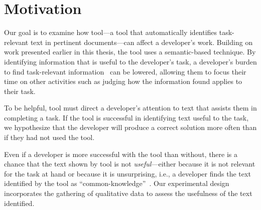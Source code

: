 


\section{Motivation}
\label{cp6:method}



Our goal is to examine how \acs{tool}---a tool that 
automatically identifies
task-relevant text in pertinent
documents---can affect a developer's work.
Building on work presented earlier in this
thesis, the tool  uses a semantic-based technique.
By identifying information that is useful to the developer's task,
a developer's burden to find task-relevant information~\cite{Robillard2015}
can be lowered,
allowing them to focus their time on other activities such as judging how the information found applies to their task.


To be helpful, \acs{tool} must direct a developer's attention to text that assists them in completing a task.
If the tool is successful in identifying text useful to the task, we hypothesize that
the developer will produce a correct solution more often than if they had not used the tool.


Even if a developer is more successful
with the tool than without, there is a chance that the text shown by \acs{tool} is not \textit{useful}---either because it is not relevant for the task at hand or because it is unsurprising, i.e.,
a developer finds the text identified by the tool as ``common-knowledge''~\cite{cwalina2008, Robillard2015}. Our experimental design incorporates the gathering of qualitative data to assess the usefulness of the text identified.

 




